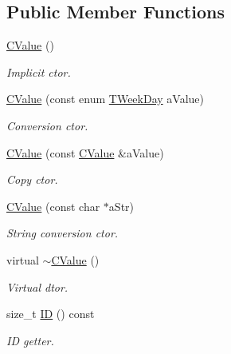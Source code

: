 \subsection*{Public Member Functions}
\begin{DoxyCompactItemize}
\item 
\hyperlink{class_c_value___t_week_day_1_1_c_value_acea76df48114b736ed8002c542e59f0e}{C\+Value} ()
\begin{DoxyCompactList}\small\item\em Implicit c\textquotesingle{}tor. \end{DoxyCompactList}\item 
\hyperlink{class_c_value___t_week_day_1_1_c_value_a055e113aa1b4725dba3ddb8a7a986061}{C\+Value} (const enum \hyperlink{namespace_c_value___t_week_day_a6412f204509f223b789fb5f1a61a6124}{T\+Week\+Day} a\+Value)
\begin{DoxyCompactList}\small\item\em Conversion c\textquotesingle{}tor. \end{DoxyCompactList}\item 
\hyperlink{class_c_value___t_week_day_1_1_c_value_a758eb97770180f10addd1c597b13e6d2}{C\+Value} (const \hyperlink{class_c_value___t_week_day_1_1_c_value}{C\+Value} \&a\+Value)
\begin{DoxyCompactList}\small\item\em Copy c\textquotesingle{}tor. \end{DoxyCompactList}\item 
\hyperlink{class_c_value___t_week_day_1_1_c_value_a5f425476b8d7006138a270ba55c210b1}{C\+Value} (const char $\ast$a\+Str)
\begin{DoxyCompactList}\small\item\em String conversion c\textquotesingle{}tor. \end{DoxyCompactList}\item 
virtual \hyperlink{class_c_value___t_week_day_1_1_c_value_a2b588e6afc0801080a7c23291de5d964}{$\sim$\+C\+Value} ()
\begin{DoxyCompactList}\small\item\em Virtual d\textquotesingle{}tor. \end{DoxyCompactList}\item 
size\+\_\+t \hyperlink{class_c_value___t_week_day_1_1_c_value_ac1441867813d4c170f416b8fe5894324}{ID} () const
\begin{DoxyCompactList}\small\item\em ID getter. \end{DoxyCompactList}\item 

\end{DoxyCompactItemize}
